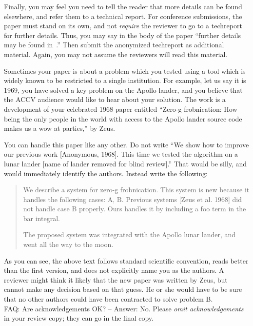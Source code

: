 \documentclass[runningheads]{llncs}
\begin{document}
Finally, you may feel you need to tell the reader that more details can be found elsewhere, and refer them to a technical report.  For conference submissions, the paper must stand on its own, and not {\em require} the reviewer to go to a techreport for further details.  Thus, you may say in the body of the paper ``further details may be found in~\cite{Authors18b}.''  Then submit the anonymized techreport as additional material. Again, you may not assume the reviewers will read this material.

Sometimes your paper is about a problem which you tested using a tool which
is widely known to be restricted to a single institution.  For example,
let us say it is 1969, you have solved a key problem on the Apollo lander,
and you believe that the ACCV audience would like to hear about your
solution.  The work is a development of your celebrated 1968 paper entitled
``Zero-g frobnication: How being the only people in the world with access to
the Apollo lander source code makes us a wow at parties,'' by Zeus.

You can handle this paper like any other.  Do not write ``We show how to
improve our previous work [Anonymous, 1968].  This time we tested the
algorithm on a lunar lander [name of lander removed for blind review].''
That would be silly, and would immediately identify the authors. Instead
write the following:
%
\begin{quotation}
\noindent
   We describe a system for zero-g frobnication.  This
   system is new because it handles the following cases:
   A, B.  Previous systems [Zeus et al. 1968] did not
   handle case B properly.  Ours handles it by including
   a foo term in the bar integral.

   The proposed system was integrated with the Apollo
   lunar lander, and went all the way to the moon.  
\end{quotation}
%
As you can see, the above text follows standard scientific convention,
reads better than the first version, and does not explicitly name you as
the authors.  A reviewer might think it likely that the new paper was
written by Zeus, but cannot make any decision based on that guess.
He or she would have to be sure that no other authors could have been
contracted to solve problem B. \\

\noindent FAQ: Are acknowledgements OK?  -- Answer: No. Please {\it omit
acknowledgements} in your review copy; they can go in the final copy.

\end{document}
